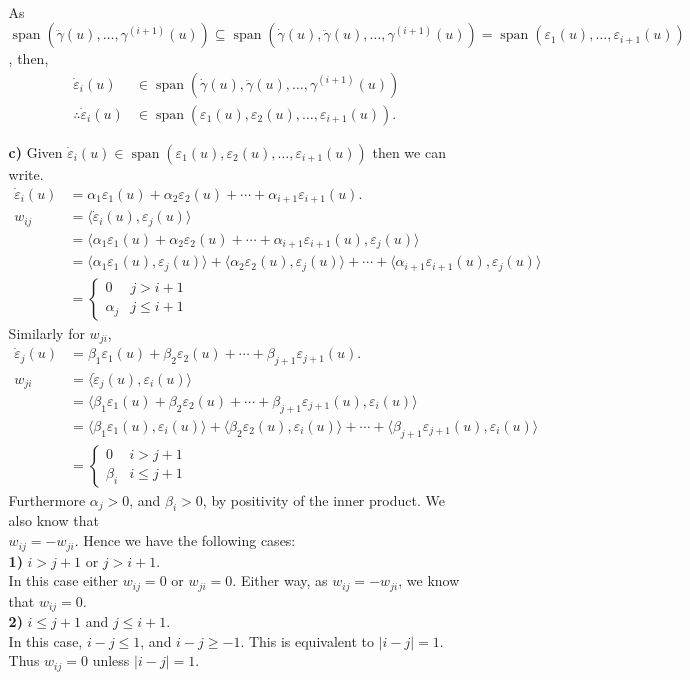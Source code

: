 \documentclass[a4paper]{article}
\newcommand{\ip}[2]{\langle #1, #2 \rangle}
\newcommand{\e}[1]{\varepsilon_{#1}(u)}
\newcommand{\dote}[1]{\dot{\varepsilon}_{#1}(u)}
\newcommand{\ds}{\displaystyle}
\DeclareMathOperator{\spn}{span}
\begin{document}
\begin{enumerate}[leftmargin=*]
\begin{enumerate}[leftmargin=*]
\begin{align*}
	\end{align*}
	As $\ds{\spn(\ddot{\gamma}(u), \dots ,\gamma^{(i + 1)}(u)) \subseteq \spn(\dot{\gamma}(u), \ddot{\gamma}(u), \dots , \gamma^{(i + 1)}(u)) = \spn(\e{1}, \dots , \e{i + 1})}$, then,
	\begin{align*}
		\dote{i} & \in \spn(\dot{\gamma}(u), \ddot{\gamma}(u), \dots , \gamma^{(i + 1)}(u)) \\
		\therefore \dote{i} & \in \spn(\e{1}, \e{2},\dots, \e{i + 1}).
	\end{align*}
	\item[\textbf{c)}]
	Given $\ds{\dote{i} \in \spn(\e{1}, \e{2}, \dots , \e{i + 1})}$ then we can write.
	\begin{align*}
		\dote{i} & = \alpha_1 \e{1} + \alpha_2 \e{2} + \cdots + \alpha_{i + 1} \e{i + 1}. \\
		w_{ij} & = \ip{\dote{i}}{\e{j}} \\
		& = \ip{\alpha_1 \e{1} + \alpha_2 \e{2} + \cdots + \alpha_{i + 1} \e{i + 1}}{\e{j}} \\
		& = \ip{\alpha_1 \e{1}}{\e{j}} + \ip{\alpha_2 \e{2}}{\e{j}} + \cdots + \ip{\alpha_{i + 1} \e{i + 1}}{\e{j}} \\
		& = \begin{cases}
			0 & j > i + 1 \\
			\alpha_j & j \leq i + 1
		\end{cases}
	\end{align*}
	Similarly for $\ds{w_{ji}}$,
	\begin{align*}
		\dote{j} & = \beta_1 \e{1} + \beta_2 \e{2} + \cdots + \beta_{j + 1} \e{j + 1}. \\
		w_{ji} & = \ip{\dote{j}}{\e{i}} \\
		& = \ip{\beta_1 \e{1} + \beta_2 \e{2} + \cdots + \beta_{j + 1} \e{j + 1}}{\e{i}} \\
		& = \ip{\beta_1 \e{1}}{\e{i}} + \ip{\beta_2 \e{2}}{\e{i}} + \cdots + \ip{\beta_{j + 1} \e{j + 1}}{\e{i}} \\
		& = \begin{cases}
			0 & i > j + 1 \\
			\beta_i & i \leq j + 1
		\end{cases}
	\end{align*}
	Furthermore $\ds{\alpha_j > 0}$, and $\ds{\beta_i > 0}$, by positivity of the inner product. We also know that\\ $\ds{w_{ij} = -w_{ji}}$. Hence we have the following cases: \\ [1mm]
	\textbf{1)} $\ds{i > j + 1}$ or $\ds{j > i + 1}$. \\ [1mm]
	In this case either $\ds{w_{ij} = 0}$ or $\ds{w_{ji} = 0}$. Either way, as $\ds{w_{ij} = -w_{ji}}$, we know that $\ds{w_{ij} = 0}$. \\ [1mm]
	\textbf{2)} $\ds{i \leq j + 1}$ and $\ds{j \leq i + 1}$. \\ [1mm]
	In this case, $\ds{i - j \leq 1}$, and $\ds{i - j \geq -1}$. This is equivalent to $\ds{|i - j| = 1}$. \\ [1mm]
	Thus $w_{ij} = 0$ unless $|i - j| = 1$.
	\end{enumerate}


\end{enumerate}
\end{document}

